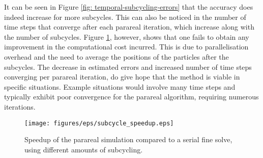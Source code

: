 It can be seen in Figure \ref{fig: temporal-subcycling-errors} that the accuracy does indeed increase for more subcycles. This can also be noticed in the number of time steps that converge after each parareal iteration, which increase along with the number of subcycles. Figure \ref{fig: temporal-subcycling}, however, shows that one fails to obtain any improvement in the computational cost incurred. This is due to parallelisation overhead and the need to average the positions of the particles after the subcycles. The decrease in estimated errors and increased number of time steps converging per parareal iteration, do give hope that the method is viable in specific situations. Example situations would involve many time steps and typically exhibit poor convergence for the parareal algorithm, requiring numerous iterations.


  \begin{figure}[h]
    \centering
    \texttt{[image: figures/eps/subcycle\_speedup.eps]}
    \caption{Speedup of the parareal simulation compared to a serial fine solve, using different amounts of subcycling.}
    \label{fig: temporal-subcycling}
\end{figure}

